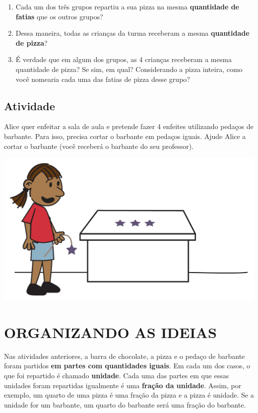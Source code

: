 \begin{enumerate} [\quad a)] %
  \item Cada um dos três grupos repartiu a sua pizza na mesma \textbf{quantidade de fatias} que os outros grupos?
  \item Dessa maneira, todas as crianças da turma receberam a mesma \textbf{quantidade de pizza}?
  \item É verdade que em algum dos grupos, as 4 crianças receberam a mesma quantidade de pizza? Se sim, em qual? Considerando a pizza inteira, como você nomearia cada uma das fatias de pizza desse grupo?
\end{enumerate} %

\subsection{Atividade}

Alice quer enfeitar a sala de aula e pretende fazer 4 enfeites utilizando pedaços de barbante. Para isso, precisa cortar o barbante em pedaços iguais. Ajude Alice a cortar o barbante (você receberá o barbante do seu professor).

\begin{center}
    \includegraphics[width=400pt, keepaspectratio]{../figuras/licao01/ativ3_fig01.png}
  \end{center}


\section{ORGANIZANDO AS IDEIAS }

Nas atividades anteriores, a barra de chocolate, a pizza e o pedaço de barbante foram partidos \textbf{em partes com quantidades iguais}.
Em cada um dos casos, o que foi repartido é chamado \textbf{unidade}. Cada uma das partes em que essas unidades foram repartidas igualmente é uma \textbf{fração da unidade}. Assim, por exemplo, um quarto de uma pizza é uma fração da pizza e a pizza é unidade. Se a unidade for um barbante, um quarto do barbante será uma fração do barbante.


